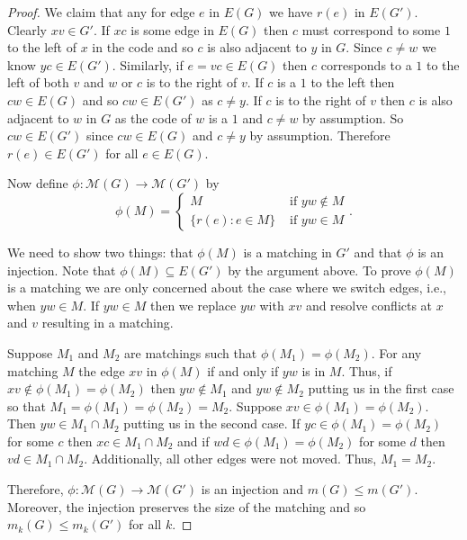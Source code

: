 \documentclass[12pt]{amsart}
\theoremstyle{plain}
\theoremstyle{definition}
\newcommand{\cM}{\mathcal{M}}
\begin{document}
\begin{proof}
We claim that any for edge $e$ in $E(G)$ we have $r(e)$ in $E(G')$.  Clearly $xv\in G'$. If $xc$ is some edge in $E(G)$ then $c$ must correspond to some $1$ to the left of $x$ in the code and so $c$ is also adjacent to $y$ in $G$.  Since $c\neq w$ we know $yc \in E(G')$.  
 Similarly, if $e=vc\in E(G)$ then $c$ corresponds to a $1$ to the left of both $v$ and $w$ or $c$ is to the right of $v$.   
 If $c$ is a $1$ to the left then $cw\in E(G)$ and so $cw\in E(G')$ as $c\neq y$.  
 If $c$ is to the right of $v$ then $c$ is also adjacent to $w$ in $G$ as the code of $w$ is a $1$ and $c\neq w$ by assumption.  
 So $cw\in E(G')$ since $cw\in E(G)$ and $c\neq y$ by assumption. Therefore $r(e)\in E(G')$ for all $e\in E(G)$. 
 
 Now define $\phi: \cM(G) \to \cM(G')$ by
 $$\phi(M)=
 \begin{cases}
 M  &\text{ if } yw\notin M\\
 \{r(e): e\in M\}  &\text{ if } yw\in M
 \end{cases}.$$
 
We need to show two things: that $\phi(M)$ is a matching in $G'$ and that $\phi$ is an injection.  
Note that $\phi(M)\subseteq E(G')$ by the argument above. 
To prove $\phi(M)$ is a matching we are only concerned about the case where we switch edges, i.e., when $yw\in M$. 
 If $yw\in M$ then we replace $yw$ with $xv$ and resolve conflicts at $x$ and $v$ resulting in a matching.

Suppose $M_1$ and $M_2$ are matchings such that $\phi(M_1)=\phi(M_2)$.  For any matching $M$ the edge $xv$ in $\phi(M)$ if and only if $yw$ is in $M$.  Thus, if $xv\notin \phi(M_1) = \phi(M_2)$ then $yw\notin M_1$ and $yw\notin M_2$ putting us in the first case so that $M_1=\phi(M_1)=\phi(M_2)=M_2$.  Suppose $xv\in \phi( M_1) = \phi(M_2)$.  Then $yw\in M_1 \cap M_2$ putting us in the second case.  If $yc\in \phi(M_1) = \phi(M_2)$ for some $c$ then $xc\in M_1\cap M_2$ and if $wd\in \phi(M_1)=\phi(M_2)$ for some $d$ then $vd\in M_1\cap M_2$.  Additionally, all other edges were not moved.  Thus, $M_1=M_2$.

Therefore, $\phi: \cM(G) \to \cM(G')$ is an injection and $m(G)\leq m(G')$.  Moreover, the injection preserves the size of the matching and so $m_k(G) \leq m_k(G')$ for all $k$.


\end{proof}
\end{document}
